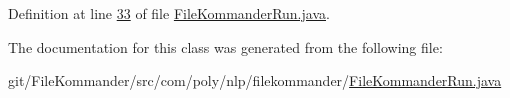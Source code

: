 Definition at line \hyperlink{L33}{33} of file \hyperlink{}{File\-Kommander\-Run.\-java}.



The documentation for this class was generated from the following file\-:\begin{DoxyCompactItemize}
\item 
git/\-File\-Kommander/src/com/poly/nlp/filekommander/\hyperlink{_file_kommander_run_8java}{File\-Kommander\-Run.\-java}\end{DoxyCompactItemize}
